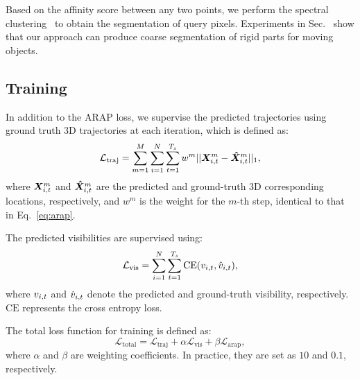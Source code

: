 Based on the affinity score between any two points, we perform the spectral clustering~\tocite{} to obtain the segmentation of query pixels.
Experiments in Sec.~\tocite{} show that our approach can produce coarse segmentation of rigid parts for moving objects.
\fi

\subsection{Training}
\label{sec:training}

In addition to the ARAP loss, we supervise the predicted trajectories using ground truth 3D trajectories at each iteration, which is defined as:
\begin{equation}
    \mathcal{L}_{\text{traj}} = \sum_{m=1}^{M} \sum_{i=1}^{N} \sum_{t=1}^{T_s} w^m ||\bm{X}_{i,t}^m -\bm{\hat{X}}_{i,t}^m||_1,
\end{equation}
where $\bm{X}_{i,t}^m$ and $\bm{\hat{X}}_{i,t}^m$ are the predicted and ground-truth 3D corresponding locations, respectively, and $w^m$ is the weight for the $m$-th step, identical to that in Eq.~\ref{eq:arap}.

The predicted visibilities are supervised using:
\begin{equation}
    \mathcal{L}_{\text{vis}} = \sum_{i=1}^{N}\sum_{t=1}^{T_s} \text{CE}(v_{i,t}, \hat{v}_{i,t}),
\end{equation}
where $v_{i,t}$ and $\hat{v}_{i,t}$ denote the predicted and ground-truth visibility, respectively.
$\text{CE}$ represents the cross entropy loss.

The total loss function for training is defined as:
\begin{equation}
    \mathcal{L}_{\text{total}} = \mathcal{L}_{\text{traj}} + \alpha\mathcal{L}_{\text{vis}} + \beta\mathcal{L}_{\text{arap}},
\end{equation}
where $\alpha$ and $\beta$ are weighting coefficients.
In practice, they are set as $10$ and $0.1$, respectively.


